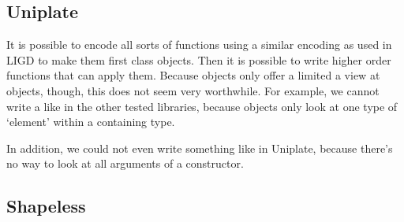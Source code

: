 

\subsection{Uniplate}
It is possible to encode all sorts of functions using a similar encoding
as used in LIGD to make them first class objects. Then it is possible to write
higher order functions that can apply them. Because  objects only offer
a limited a view at objects, though, this does not seem very worthwhile. For
example, we cannot write a  like in the other tested libraries, because
 objects only look at one type of `element' within a containing
type.

In addition, we could not even write something like  in Uniplate,
because there's no way to look at all arguments of a constructor.


\subsection{Shapeless}
